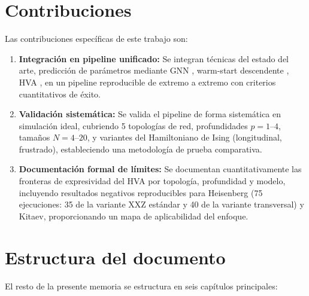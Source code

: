 \documentclass[11pt,a4paper,spanish]{book}
\begin{document}
\section{Contribuciones}

Las contribuciones específicas de este trabajo son:

\begin{enumerate}
    \item \textbf{Integración en pipeline unificado:} Se integran técnicas del estado del arte, predicción de parámetros mediante GNN \citep{miao2024, zhang2025}, warm-start descendente \citep{puig2025}, HVA \citep{wiersema2020}, en un pipeline reproducible de extremo a extremo con criterios cuantitativos de éxito.

    \item \textbf{Validación sistemática:} Se valida el pipeline de forma sistemática en simulación ideal, cubriendo 5 topologías de red, profundidades $p = 1$--$4$, tamaños $N = 4$--$20$, y variantes del Hamiltoniano de Ising (longitudinal, frustrado), estableciendo una metodología de prueba comparativa.

    \item \textbf{Documentación formal de límites:} Se documentan cuantitativamente las fronteras de expresividad del HVA por topología, profundidad y modelo, incluyendo resultados negativos reproducibles para Heisenberg (75 ejecuciones: 35 de la variante XXZ estándar y 40 de la variante transversal) y Kitaev, proporcionando un mapa de aplicabilidad del enfoque.
\end{enumerate}

\section{Estructura del documento}

El resto de la presente memoria se estructura en seis capítulos principales:
\end{document}
